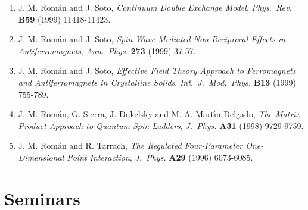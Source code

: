 \documentclass{article}
\begin{document}
\begin{enumerate}
\item J. M. Rom\'an and J. Soto, 
{\it Continuum Double Exchange Model},
{\it Phys.~Rev.} {\bf B59} (1999) 11418-11423.

\item J. M. Rom\'an and J. Soto, 
{\it Spin Wave Mediated Non-Reciprocal Effects in Antiferromagnets}, 
{\it Ann.~Phys.} {\bf 273} (1999) 37-57.

\item J. M. Rom\'an and J. Soto, 
{\it Effective Field Theory Approach to Ferromagnets and Antiferromagnets 
in Crystalline Solids}, 
{\it Int.~J.~Mod.~Phys.} {\bf B13} (1999) 755-789.

\item J. M. Rom\'an, G. Sierra, J. Dukelsky and M. A. Mart\'{\i}n-Delgado, 
{\it The Matrix Product Approach to Quantum Spin Ladders}, 
{\it J.~Phys.} {\bf A31} (1998) 9729-9759.

\item J. M. Rom\'an and R. Tarrach, 
{\it The Regulated Four-Parameter One-Dimensional Point Interaction}, 
{\it J.~Phys.} {\bf A29} (1996) 6073-6085.
\end{enumerate}




\section*{Seminars}
\end{document}
